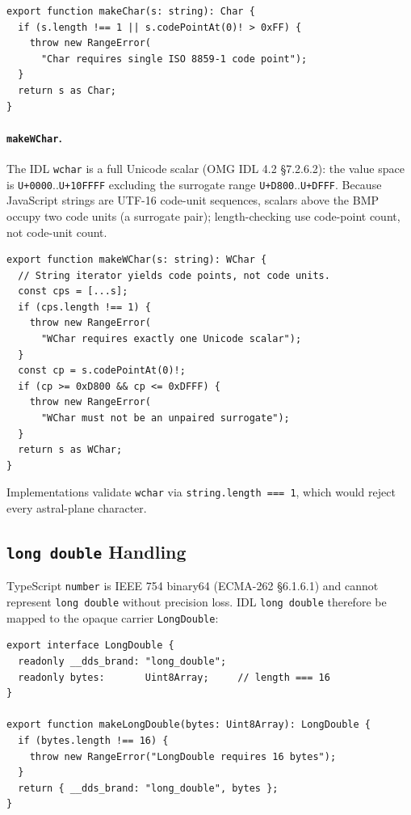 \documentclass{../styles/zerodds-vendor-spec}
\begin{document}
\begin{lstlisting}
export function makeChar(s: string): Char {
  if (s.length !== 1 || s.codePointAt(0)! > 0xFF) {
    throw new RangeError(
      "Char requires single ISO 8859-1 code point");
  }
  return s as Char;
}
\end{lstlisting}

\paragraph{\texttt{makeWChar}.} The IDL \texttt{wchar} is a full
Unicode scalar (OMG IDL 4.2 §7.2.6.2): the value space is
\texttt{U+0000}..\texttt{U+10FFFF} excluding the surrogate range
\texttt{U+D800}..\texttt{U+DFFF}. Because JavaScript strings are
UTF-16 code-unit sequences, scalars above the BMP occupy two
code units (a surrogate pair); length-checking  use
code-point count, not code-unit count.

\begin{lstlisting}
export function makeWChar(s: string): WChar {
  // String iterator yields code points, not code units.
  const cps = [...s];
  if (cps.length !== 1) {
    throw new RangeError(
      "WChar requires exactly one Unicode scalar");
  }
  const cp = s.codePointAt(0)!;
  if (cp >= 0xD800 && cp <= 0xDFFF) {
    throw new RangeError(
      "WChar must not be an unpaired surrogate");
  }
  return s as WChar;
}
\end{lstlisting}

Implementations  validate \texttt{wchar} via
\texttt{string.length === 1}, which would reject every
astral-plane character.

\subsection{\texttt{long double} Handling}\label{sec:long-double}

TypeScript \texttt{number} is IEEE 754 binary64 (ECMA-262
§6.1.6.1) and cannot represent \texttt{long double} without
precision loss. IDL \texttt{long double} 
therefore be mapped to the opaque carrier \texttt{LongDouble}:

\begin{lstlisting}
export interface LongDouble {
  readonly __dds_brand: "long_double";
  readonly bytes:       Uint8Array;     // length === 16
}

export function makeLongDouble(bytes: Uint8Array): LongDouble {
  if (bytes.length !== 16) {
    throw new RangeError("LongDouble requires 16 bytes");
  }
  return { __dds_brand: "long_double", bytes };
}
\end{lstlisting}
\end{document}
